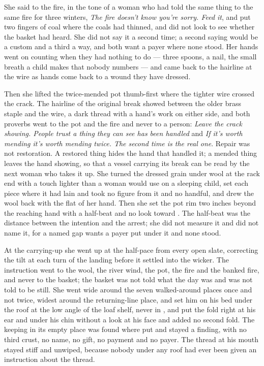 She said to the fire, in the tone of a woman who had told the same thing to the same fire for three winters, \emph{The fire doesn't know you're sorry. Feed it}, and put two fingers of coal where the coals had thinned, and did not look to see whether the basket had heard. She did not say it a second time; a second saying would be a custom and a third a way, and both want a payer where none stood. Her hands went on counting when they had nothing to do --- three spoons, a nail, the small breath a child makes that nobody numbers --- and came back to the hairline at the wire as hands come back to a wound they have dressed.

Then she lifted the twice-mended pot thumb-first where the tighter wire crossed the crack. The hairline of the original break showed between the older brass staple and the wire, a dark thread with a hand's work on either side, and both proverbs went to the pot and the fire and never to a person: \emph{Leave the crack showing. People trust a thing they can see has been handled} and \emph{If it's worth mending it's worth mending twice. The second time is the real one}. Repair was not restoration. A restored thing hides the hand that handled it; a mended thing leaves the hand showing, so that a vessel carrying its break can be read by the next woman who takes it up. She turned the dressed grain under wool at the rack end with a touch lighter than a woman would use on a sleeping child, set each piece where it had lain and took no figure from it and no handful, and drew the wool back with the flat of her hand. Then she set the pot rim two inches beyond the reaching hand with a half-beat and no look toward . The half-beat was the distance between the intention and the arrest; she did not measure it and did not name it, for a named gap wants a payer put under it and none stood.

At the carrying-up she went up  at the half-pace from every open slate, correcting the tilt at each turn of the landing before it settled into the wicker. The instruction went to the wool, the river wind, the pot, the fire and the banked fire, and never to the basket; the basket was not told what the day was and was not told to be still. She went wide around the seven walked-around places once and not twice, widest around the returning-line place, and set him on his bed under the roof at the low angle of the loaf shelf, never in , and put the fold right at his ear and under his chin without a look at his face and added no second fold. The keeping in its empty place was found where put and stayed a finding, with no third crust, no name, no gift, no payment and no payer. The thread at his mouth stayed stiff and unwiped, because nobody under any roof had ever been given an instruction about the thread.


